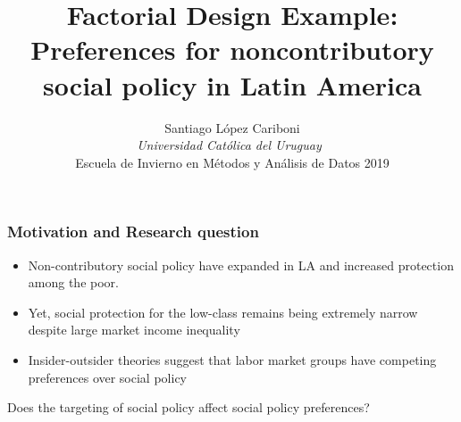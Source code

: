 \documentclass{beamer}\usepackage[]{graphicx}\usepackage[]{color}
\title{Factorial Design Example: Preferences for noncontributory social policy in Latin America}
\author{ Santiago L\'opez Cariboni \\ \emph{Universidad Cat\'olica del Uruguay}~\\
Escuela de Invierno en M\'etodos y An\'alisis de Datos 2019
}
\date{}
\begin{document}
\begin{frame}
\maketitle


\end{frame}

\begin{frame}\frametitle{Motivation and Research question}

\begin{itemize}
	\item Non-contributory social policy have expanded in LA and increased protection among the poor. 
	\item Yet, social protection for the low-class remains being extremely narrow despite large market income inequality
	\item Insider-outsider theories suggest that labor market groups have competing preferences over social policy

\end{itemize}

Does the targeting of social policy affect social policy preferences?

\end{frame}
\end{document}
